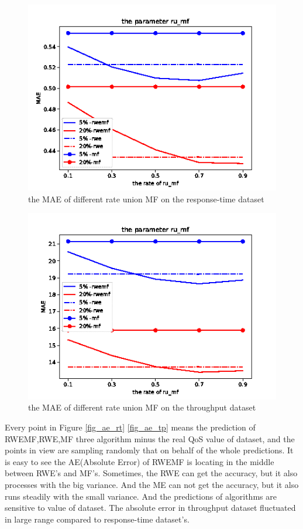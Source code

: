 \documentclass[conference]{IEEEtran}
\begin{document}
\begin{figure}[H] 
\centering  
\includegraphics[width=0.45\paperwidth]{rumf_rt.png}  
\caption{the MAE of different rate union MF on the response-time dataset }  
\label{fig_rumf_rt}  
\end{figure} 

\begin{figure}[H] 
\centering  
\includegraphics[width=0.45\paperwidth]{rumf_tp.png}  
\caption{the MAE of different rate union MF  on the throughput dataset }  
\label{fig_rumf_tp}  
\end{figure} 

\par Every point in Figure \ref{fig_ae_rt} \ref{fig_ae_tp} means the prediction of RWEMF,RWE,MF three algorithm minus the real QoS value of dataset, and the points in view are sampling randomly that on behalf of the whole predictions. It is easy to see the AE(Absolute Error) of RWEMF is locating in the middle between RWE's and MF's. Sometimes, the RWE can get the accuracy, but it also processes with the big variance. And the ME can not get the accuracy, but it also runs steadily with the small variance. And the predictions of algorithms are sensitive to value of dataset. The absolute error in throughput dataset fluctuated in large range compared to response-time dataset's.
\end{document}

